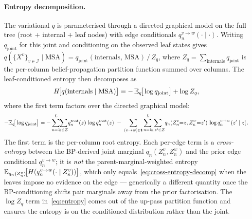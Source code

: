 \paragraph{Entropy decomposition.}
The variational $q$ is parameterised through a directed graphical
model on the full tree (root + internal + leaf nodes) with edge
conditionals $q^{v \to w}_n(\cdot \mid \cdot)$.
Writing $q_{\text{joint}}$ for this joint and conditioning on the
observed leaf states gives
$q(\{X^v\}_{v \in \mathcal{I}} \mid \text{MSA})
 = q_{\text{joint}}(\text{internals},\,\text{MSA})\,/\,Z_q$,
where $Z_q = \sum_{\text{internals}} q_{\text{joint}}$ is the
per-column belief-propagation partition function summed over columns.
The leaf-conditioned entropy then decomposes as
\begin{equation}
\label{eq:entropy}
H\!\big[q(\text{internals} \mid \text{MSA})\big]
= -\,\mathbb{E}_q\!\big[\log q_{\text{joint}}\big] + \log Z_q,
\end{equation}
where the first term factors over the directed graphical model:
\begin{equation}
\label{eq:cross-entropy-decomp}
-\mathbb{E}_q\!\big[\log q_{\text{joint}}\big]
= -\sum_{n=1}^{L}\!\!\sum_{z \in \mathcal{Z}}\!
       q_n^{\text{root}}(z)\,\log q_n^{\text{root}}(z)
\;-\;
\sum_{(v \to w) \in \mathbf{t}}
\sum_{n=1}^{L}\!\!\sum_{z, z' \in \mathcal{Z}}\!
   q_n(Z^v_n{=}z, Z^w_n{=}z')\,\log q_n^{v \to w}(z' \mid z).
\end{equation}
The first term is the per-column root entropy.
Each per-edge term is a \emph{cross-entropy} between the BP-derived
joint marginal $q_n(Z^v_n, Z^w_n)$ and the prior edge conditional
$q_n^{v \to w}$;
it is \emph{not} the parent-marginal-weighted entropy
$\mathbb{E}_{q_n(Z^v_n)}\!\big[H(q_n^{v \to w}(\cdot \mid Z^v_n))\big]$,
which only equals~\eqref{eq:cross-entropy-decomp} when the leaves
impose no evidence on the edge — generically a different quantity
once the BP-conditioning shifts pair marginals away from the prior
factorisation.
The $\log Z_q$ term in~\eqref{eq:entropy} comes out of the up-pass
partition function and ensures the entropy is on the conditioned
distribution rather than the joint.


